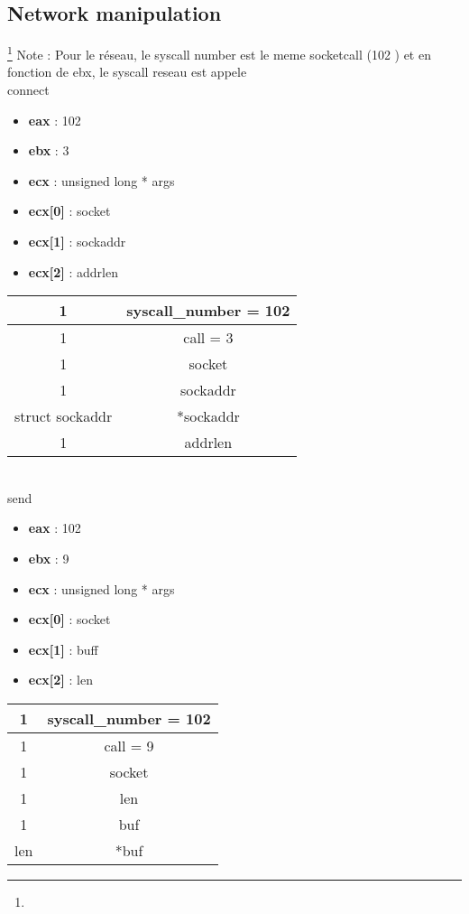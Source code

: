 \documentclass{report}
\begin{document}
\subsection{Network manipulation}\footnote{}
Note : Pour le réseau, le syscall number est le meme socketcall (102 ) et en fonction de ebx, le syscall reseau est appele\\
connect
\begin{itemize}
\item \textbf{eax} : 102
\item \textbf{ebx} : 3
\item \textbf{ecx} : unsigned  long * args
\item \textbf{ecx[0]} : socket
\item \textbf{ecx[1]} : sockaddr
\item \textbf{ecx[2]} : addrlen
\end{itemize}
\begin{tabular}{| c | c | }
\hline
1 & syscall\_number = 102 \\ \hline 
1 & call = 3 \\ \hline 
1 & socket \\ \hline 
1 & sockaddr  \\ \hline
struct sockaddr & *sockaddr \\ \hline
1 & addrlen  \\ \hline
\end{tabular}
\\
send
\begin{itemize}
\item \textbf{eax} : 102
\item \textbf{ebx} : 9
\item \textbf{ecx} : unsigned  long * args
\item \textbf{ecx[0]} : socket
\item \textbf{ecx[1]} : buff
\item \textbf{ecx[2]} : len
\end{itemize}
\begin{tabular}{| c | c | }
\hline
1 & syscall\_number = 102 \\ \hline 
1 & call = 9 \\ \hline 
1 & socket \\ \hline 
1 & len \\ \hline 
1 & buf  \\ \hline
len & *buf  \\ \hline
\end{tabular}
\end{document}
